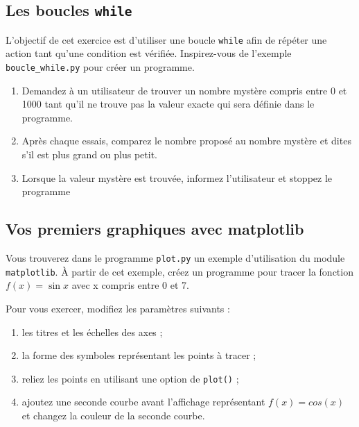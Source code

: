 \subsection{Les boucles  \texttt{while}}

L'objectif de  cet exercice  est d'utiliser une  boucle \texttt{while}
afin  de  répéter  une  action tant  qu'une  condition  est  vérifiée.
Inspirez-vous de  l'exemple \texttt{boucle\_while.py}  pour créer  un
programme.

\begin{enumerate}
\item Demandez à  un utilisateur de trouver un  nombre mystère compris
  entre 0 et 1000  tant qu'il ne trouve pas la  valeur exacte qui sera
  définie dans le programme.

\item  Après  chaque essais,  comparez  le  nombre proposé  au  nombre
  mystère et dites s'il est plus grand ou plus petit.

\item Lorsque la valeur mystère est trouvée, informez l'utilisateur et
  stoppez le programme

\end{enumerate}



\subsection{Vos premiers graphiques avec matplotlib}

Vous  trouverez   dans  le   programme  \texttt{plot.py}   un  exemple
d'utilisation du  module \texttt{matplotlib}. À partir  de cet exemple,
créez  un programme  pour  tracer  la fonction  $f(x)=\sin  x$ avec  x
compris entre 0 et 7.

Pour vous exercer, modifiez les paramètres suivants :

\begin{enumerate}
\item les titres et les échelles des axes ;

\item la forme des  symboles représentant les points à tracer ;

\item reliez les points en utilisant une option de \texttt{plot()} ;

\item ajoutez une seconde courbe avant l'affichage représentant $f(x)=cos(x)$ et changez la couleur
  de la seconde courbe.


\end{enumerate}


